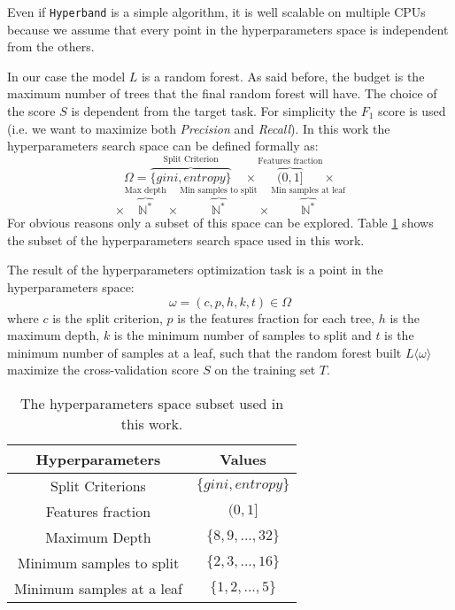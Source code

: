 \documentclass[11pt, a4paper]{article}
\begin{document}
  Even if \texttt{Hyperband} is a simple algorithm, it is well scalable on multiple CPUs because we assume that every point in the hyperparameters space is independent from the others.

  In our case the model $L$ is a random forest. As said before, the budget is the maximum number of trees that the final random forest will have. The choice of the score $S$ is dependent from the target task. For simplicity the $F_{1}$ score is used (i.e. we want to maximize both \textit{Precision} and \textit{Recall}). In this work the hyperparameters search space can be defined formally as:
  \[\Omega = \overbrace{\{gini, entropy\}}^{\text{Split Criterion}} \quad\times \overbrace{(0, 1]}^{\text{Features fraction}} \times\]
  \[\times \overbrace{\mathbb{N}^{*}}^{\text{Max depth}} \times \overbrace{\mathbb{N}^{*}}^{\text{Min samples to split}} \times \overbrace{\mathbb{N}^{*}}^{\text{Min samples at leaf}}\]
  For obvious reasons only a subset of this space can be explored. Table \ref{table:hyperparameters} shows the subset of the hyperparameters search space used in this work.

  The result of the hyperparameters optimization task is a point in the hyperparameters space:
  \[\omega=(c, p, h, k, t)\in\Omega\]
  where $c$ is the split criterion, $p$ is the features fraction for each tree, $h$ is the maximum depth, $k$ is the minimum number of samples to split and $t$ is the minimum number of samples at a leaf, such that the random forest built $L\langle\omega\rangle$ maximize the cross-validation score $S$ on the training set $T$.

  \begin{table}[b]
    \centering
    \begin{tabular}{|c c|}
      \hline
      Hyperparameters & Values \\
      \hline\hline
      Split Criterions & $\{gini, entropy\}$ \\
      \hline
      Features fraction & $(0, 1]$ \\
      \hline
      Maximum Depth & $\{8,9,...,32\}$ \\
      \hline
      Minimum samples to split & $\{2,3,...,16\}$ \\
      \hline
      Minimum samples at a leaf & $\{1,2,...,5\}$ \\
      \hline
    \end{tabular}
    \caption{The hyperparameters space subset used in this work.}
    \label{table:hyperparameters}
  \end{table}
\end{document}
